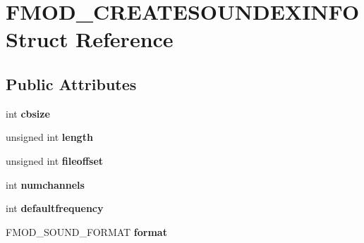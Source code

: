 \hypertarget{struct_f_m_o_d___c_r_e_a_t_e_s_o_u_n_d_e_x_i_n_f_o}{\section{F\-M\-O\-D\-\_\-\-C\-R\-E\-A\-T\-E\-S\-O\-U\-N\-D\-E\-X\-I\-N\-F\-O Struct Reference}
\label{struct_f_m_o_d___c_r_e_a_t_e_s_o_u_n_d_e_x_i_n_f_o}
}
\subsection*{Public Attributes}
\begin{DoxyCompactItemize}
\item 
\hypertarget{struct_f_m_o_d___c_r_e_a_t_e_s_o_u_n_d_e_x_i_n_f_o_a905941acdbc5922a694fbb44761a1fa6}{int {\bfseries cbsize}}\label{struct_f_m_o_d___c_r_e_a_t_e_s_o_u_n_d_e_x_i_n_f_o_a905941acdbc5922a694fbb44761a1fa6}

\item 
\hypertarget{struct_f_m_o_d___c_r_e_a_t_e_s_o_u_n_d_e_x_i_n_f_o_a4747dfdcc1a5b3aa8429b265655a0745}{unsigned int {\bfseries length}}\label{struct_f_m_o_d___c_r_e_a_t_e_s_o_u_n_d_e_x_i_n_f_o_a4747dfdcc1a5b3aa8429b265655a0745}

\item 
\hypertarget{struct_f_m_o_d___c_r_e_a_t_e_s_o_u_n_d_e_x_i_n_f_o_a7b44d4b86cadbcd0b82f7103312d64ae}{unsigned int {\bfseries fileoffset}}\label{struct_f_m_o_d___c_r_e_a_t_e_s_o_u_n_d_e_x_i_n_f_o_a7b44d4b86cadbcd0b82f7103312d64ae}

\item 
\hypertarget{struct_f_m_o_d___c_r_e_a_t_e_s_o_u_n_d_e_x_i_n_f_o_a07286cab031745284732e094ca8f722e}{int {\bfseries numchannels}}\label{struct_f_m_o_d___c_r_e_a_t_e_s_o_u_n_d_e_x_i_n_f_o_a07286cab031745284732e094ca8f722e}

\item 
\hypertarget{struct_f_m_o_d___c_r_e_a_t_e_s_o_u_n_d_e_x_i_n_f_o_abc2bb4d103afbbffb3cfdda4dc54b10b}{int {\bfseries defaultfrequency}}\label{struct_f_m_o_d___c_r_e_a_t_e_s_o_u_n_d_e_x_i_n_f_o_abc2bb4d103afbbffb3cfdda4dc54b10b}

\item 
\hypertarget{struct_f_m_o_d___c_r_e_a_t_e_s_o_u_n_d_e_x_i_n_f_o_a1cfd3a1633370ea3016f722f8c2531ce}{F\-M\-O\-D\-\_\-\-S\-O\-U\-N\-D\-\_\-\-F\-O\-R\-M\-A\-T {\bfseries format}}\label{struct_f_m_o_d___c_r_e_a_t_e_s_o_u_n_d_e_x_i_n_f_o_a1cfd3a1633370ea3016f722f8c2531ce}


\end{DoxyCompactItemize}
